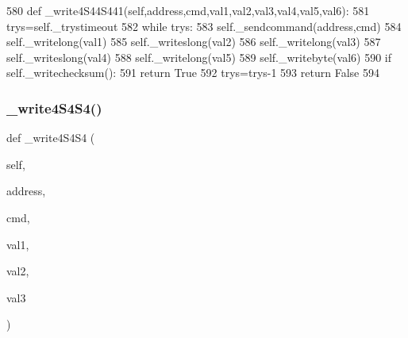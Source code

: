 \begin{DoxyCode}
580     \textcolor{keyword}{def }\_write4S44S441(self,address,cmd,val1,val2,val3,val4,val5,val6):
581         trys=self.\_trystimeout
582         \textcolor{keywordflow}{while} trys:
583             self.\_sendcommand(address,cmd)
584             self.\_writelong(val1)
585             self.\_writeslong(val2)
586             self.\_writelong(val3)
587             self.\_writeslong(val4)
588             self.\_writelong(val5)
589             self.\_writebyte(val6)
590             \textcolor{keywordflow}{if} self.\_writechecksum():
591                 \textcolor{keywordflow}{return} \textcolor{keyword}{True}
592             trys=trys-1
593         \textcolor{keywordflow}{return} \textcolor{keyword}{False}
594 
\end{DoxyCode}
\mbox{\label{classtoxic__hardware_1_1roboclaw__3_1_1Roboclaw_a3cd6f858935eaf1dcb0563bd81e97cc0}} 
\subsubsection{\texorpdfstring{\+\_\+write4\+S4\+S4()}{\_write4S4S4()}}
{\footnotesize\ttfamily def \+\_\+write4\+S4\+S4 (\begin{DoxyParamCaption}\item[{}]{self,  }\item[{}]{address,  }\item[{}]{cmd,  }\item[{}]{val1,  }\item[{}]{val2,  }\item[{}]{val3 }\end{DoxyParamCaption})\hspace{0.3cm}{\ttfamily [private]}}


